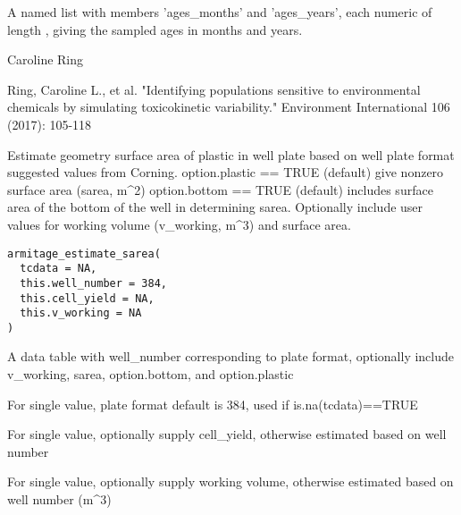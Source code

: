\documentclass[a4paper]{book}
\begin{document}
%
\begin{Value}
A named list with members 'ages\_months' and 'ages\_years', each
numeric of length , giving the sampled ages in months and years.
\end{Value}
%
\begin{Author}\relax
Caroline Ring
\end{Author}
%
\begin{References}\relax
Ring, Caroline L., et al. "Identifying populations sensitive to
environmental chemicals by simulating toxicokinetic variability."
Environment International 106 (2017): 105-118
\end{References}
%
\begin{Description}\relax
Estimate geometry surface area of plastic in well plate based on well plate
format suggested values from Corning.  option.plastic == TRUE (default) give
nonzero surface area (sarea, m\textasciicircum{}2) option.bottom == TRUE (default) includes
surface area of the bottom of the well in determining sarea.  Optionally
include user values for working volume (v\_working, m\textasciicircum{}3) and surface area.
\end{Description}
%
\begin{Usage}
\begin{verbatim}
armitage_estimate_sarea(
  tcdata = NA,
  this.well_number = 384,
  this.cell_yield = NA,
  this.v_working = NA
)
\end{verbatim}
\end{Usage}
%
\begin{Arguments}
\begin{ldescription}
\item[\code{tcdata}] A data table with well\_number corresponding to plate format,
optionally include v\_working, sarea, option.bottom, and option.plastic

\item[\code{this.well\_number}] For single value, plate format default is 384, used
if is.na(tcdata)==TRUE

\item[\code{this.cell\_yield}] For single value, optionally supply cell\_yield,
otherwise estimated based on well number

\item[\code{this.v\_working}] For single value, optionally supply working volume,
otherwise estimated based on well number (m\textasciicircum{}3)
\end{ldescription}
\end{Arguments}
\end{document}
